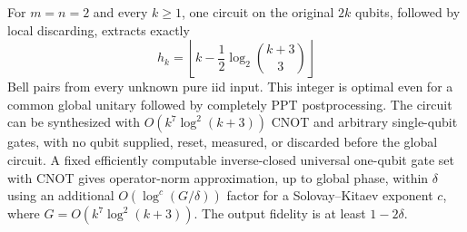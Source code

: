 \begin{proposition}\label{prop:pure-circuit}
For $m=n=2$ and every $k\ge1$, one circuit on the original $2k$ qubits, followed by local discarding, extracts exactly
\[
 h_k=\left\lfloor k-\frac12\log_2\binom{k+3}{3}\right\rfloor
\]
Bell pairs from every unknown pure iid input. This integer is optimal even for a common global unitary followed by completely PPT postprocessing. The circuit can be synthesized with $O(k^7\log^2(k+3))$ CNOT and arbitrary single-qubit gates, with no qubit supplied, reset, measured, or discarded before the global circuit. A fixed efficiently computable inverse-closed universal one-qubit gate set with CNOT gives operator-norm approximation, up to global phase, within $\delta$ using an additional $O(\log^c(G/\delta))$ factor for a Solovay--Kitaev exponent $c$, where $G=O(k^7\log^2(k+3))$. The output fidelity is at least $1-2\delta$.
\end{proposition}

